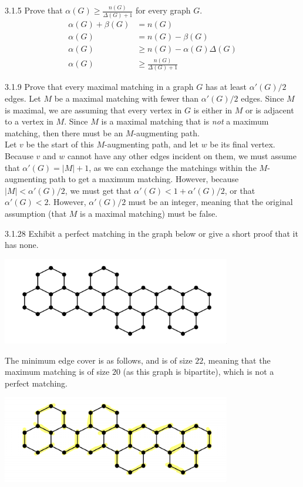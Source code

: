 \documentclass[10pt]{extarticle}
\begin{document}
  \begin{problem}{3.1.5}
    Prove that $\alpha(G) \geq \frac{n(G)}{\Delta(G)+1}$ for every graph $G$.
    \tcblower
    \begin{align*}
      \alpha(G) + \beta(G) &= n(G) \\
      \alpha(G) &= n(G) - \beta(G) \\
      \alpha(G) &\geq n(G) - \alpha(G)\Delta(G) \tag*{$\alpha(G)\Delta(G) = \max \beta(G)$} \\
      \alpha(G) &\geq \frac{n(G)}{\Delta(G) + 1}
    \end{align*}
  \end{problem}
  \begin{problem}{3.1.9}
    Prove that every maximal matching in a graph $G$ has at least $\alpha'(G)/2$ edges.
    \tcblower
    Let $M$ be a maximal matching with fewer than $\alpha'(G)/2$ edges. Since $M$ is maximal, we are assuming that every vertex in $G$ is either in $M$ or is adjacent to a vertex in $M$. Since $M$ is a maximal matching that is \textit{not} a maximum matching, then there must be an $M$-augmenting path.\\

    Let $v$ be the start of this $M$-augmenting path, and let $w$ be its final vertex. Because $v$ and $w$ cannot have any other edges incident on them, we must assume that $\alpha'(G) = |M| + 1$, as we can exchange the matchings within the $M$-augmenting path to get a maximum matching. However, because $|M| < \alpha'(G)/2$, we must get that $\alpha'(G) < 1 + \alpha'(G)/2$, or that $\alpha'(G) < 2$. However, $\alpha'(G)/2$ must be an integer, meaning that the original assumption (that $M$ is a maximal matching) must be false.
  \end{problem}
  \begin{problem}{3.1.28}
    Exhibit a perfect matching in the graph below or give a short proof that it has none. 
    \begin{center}
      \includegraphics[width=10cm]{3_1_28_question}
    \end{center}
    \tcblower
    The minimum edge cover is as follows, and is of size $22$, meaning that the maximum matching is of size $20$ (as this graph is bipartite), which is not a perfect matching.
    \begin{center}
      \includegraphics[width=10cm]{3_1_28_ans.pdf}
    \end{center}
  \end{problem}
\end{document}
